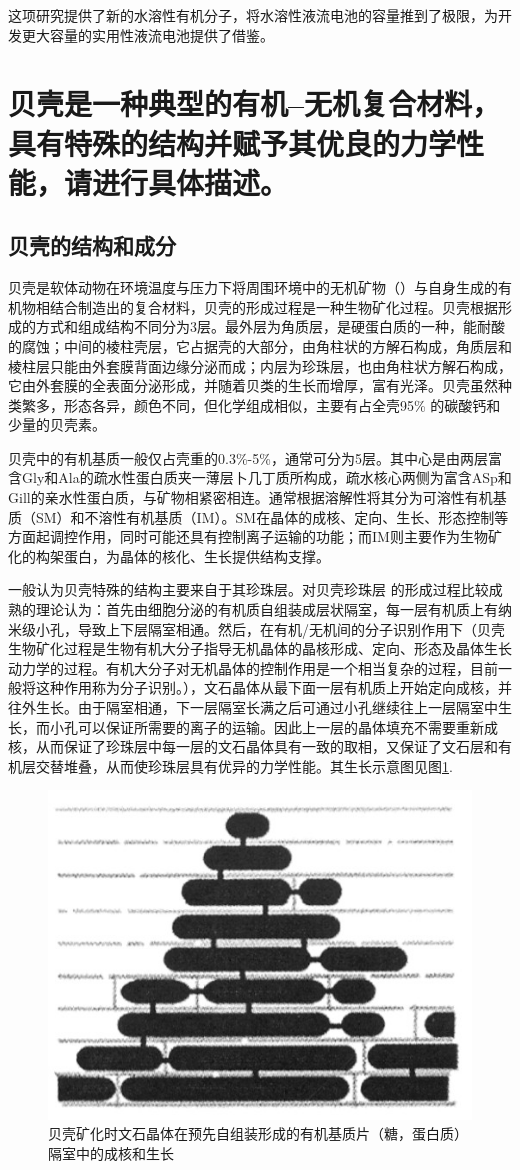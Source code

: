 \documentclass[UTF8,9pt]{ctexart}
\newcommand\se{\section}                                               %
\newcommand\sub{\subsection}                                           %
\begin{document}
这项研究提供了新的水溶性有机分子，将水溶性液流电池的容量推到了极限，为开发更大容量的实用性液流电池提供了借鉴。
\se{贝壳是一种典型的有机--无机复合材料，具有特殊的结构并赋予其优良的力学性能，请进行具体描述。}
\sub{贝壳的结构和成分}
贝壳是软体动物在环境温度与压力下将周围环境中的无机矿物（）与自身生成的有机物相结合制造出的复合材料，贝壳的形成过程是一种生物矿化过程。贝壳根据形成的方式和组成结构不同分为3层。最外层为角质层，是硬蛋白质的一种，能耐酸的腐蚀；中间的棱柱壳层，它占据壳的大部分，由角柱状的方解石构成，角质层和棱柱层只能由外套膜背面边缘分泌而成；内层为珍珠层，也由角柱状方解石构成，它由外套膜的全表面分泌形成，并随着贝类的生长而增厚，富有光泽。贝壳虽然种类繁多，形态各异，颜色不同，但化学组成相似，主要有占全壳95\% 的碳酸钙和少量的贝壳素。

贝壳中的有机基质一般仅占壳重的0.3\%-5\%，通常可分为5层。其中心是由两层富含Gly和Ala的疏水性蛋白质夹一薄层卜几丁质所构成，疏水核心两侧为富含ASp和Gill的亲水性蛋白质，与矿物相紧密相连。通常根据溶解性将其分为可溶性有机基质（SM）和不溶性有机基质（IM）。SM在晶体的成核、定向、生长、形态控制等方面起调控作用，同时可能还具有控制离子运输的功能；而IM则主要作为生物矿化的构架蛋白，为晶体的核化、生长提供结构支撑。

 一般认为贝壳特殊的结构主要来自于其珍珠层。对贝壳珍珠层
的形成过程比较成熟的理论认为：首先由细胞分泌的有机质自组装成层状隔室，每一层有机质上有纳米级小孔，导致上下层隔室相通。然后，在有机/无机间的分子识别作用下（贝壳生物矿化过程是生物有机大分子指导无机晶体的晶核形成、定向、形态及晶体生长动力学的过程。有机大分子对无机晶体的控制作用是一个相当复杂的过程，目前一般将这种作用称为分子识别。），文石晶体从最下面一层有机质上开始定向成核，并往外生长。由于隔室相通，下一层隔室长满之后可通过小孔继续往上一层隔室中生长，而小孔可以保证所需要的离子的运输。因此上一层的晶体填充不需要重新成核，从而保证了珍珠层中每一层的文石晶体具有一致的取相，又保证了文石层和有机层交替堆叠，从而使珍珠层具有优异的力学性能。其生长示意图见图\ref{bk}.

\begin{figure}[htbp]
    \centering
    \includegraphics[scale=0.4]{6.jpg}
    \caption{贝壳矿化时文石晶体在预先自组装形成的有机基质片（糖，蛋白质）隔室中的成核和生长}
    \label{bk}
\end{figure}
\end{document}
